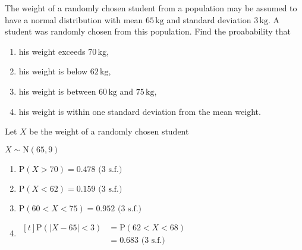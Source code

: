 \documentclass[11pt,a4paper]{book}
\begin{document}
\begin{example}

The weight of a randomly chosen student from a population may be assumed
to have a normal distribution with mean $65\,\text{kg}$ and standard
deviation $3\,\text{kg}$. A student was randomly chosen from this
population. Find the proabability that

\begin{enumerate}[label=(\alph*)] 

\item  his weight exceeds $\text{70}\,\text{kg}$,

\item  his weight is below $\text{62}\,\text{kg}$,

\item  his weight is between $60\,\text{kg}$ and $75\,\text{kg}$,

\item  his weight is within one standard deviation from the mean
weight.

\end{enumerate}

\Solution

Let $X$ be the weight of a randomly chosen student

$X\sim\text{N}\left(65,9\right)$

\begin{enumerate}[label=(\alph*)] 

\item  $\text{P}\left(X>70\right)=0.478\text{ (3 s.f.)}$

\item  $\text{P}\left(X<62\right)=0.159\text{ (3 s.f.)}$

\item  $\text{P}\left(60<X<75\right)=0.952\text{ (3 s.f.)}$

\item  
$
\begin{aligned}[t]
\text{P}\left(\left|X-65\right|<3\right) & =\text{P}\left(62<X<68\right)\\
 & =0.683\text{ (3 s.f.)}
\end{aligned}
$

\end{enumerate}

\end{example}
\end{document}

